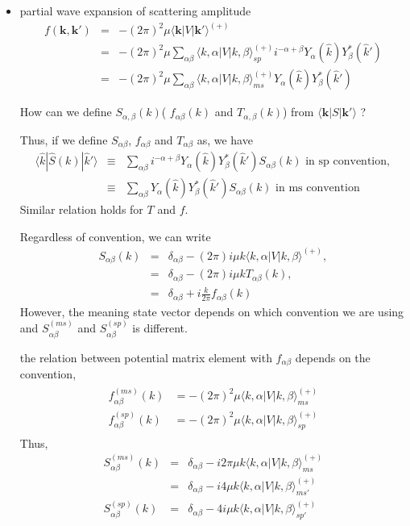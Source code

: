 \documentclass[10pt]{article}
\def\bm{\boldsymbol}
\newcommand{\bea}{\begin{eqnarray}}
\newcommand{\eea}{\end{eqnarray}}
\newcommand{\no}{\nonumber \\}
\def\vk{{\bm k}}
\def\la{\langle}
\def\ra{\rangle}
\begin{document}
\begin{itemize}
\item partial wave expansion of scattering amplitude
\bea
f(\vk,\vk')&=&-(2\pi)^2\mu \la \vk|V|\vk'\ra^{(+)}\no
           &=&-(2\pi)^2\mu \sum_{\alpha\beta} 
        \la k,\alpha|V| k,\beta\ra^{(+)}_{sp}
        i^{-\alpha+\beta}
        Y_{\alpha}(\hat{k})Y_{\beta}^*(\hat{k}') \no
        &=&-(2\pi)^2\mu \sum_{\alpha\beta} 
        \la k,\alpha|V| k,\beta\ra^{(+)}_{ms}
        Y_{\alpha}(\hat{k})Y_{\beta}^*(\hat{k}')  
\eea

How can we define $S_{\alpha,\beta}(k)$( $f_{\alpha\beta}(k)$
and $T_{\alpha,\beta}(k)$) from $\la \vk| S|\vk' \ra$ ?


Thus, if we define $S_{\alpha\beta}$, $f_{\alpha\beta}$ and
$T_{\alpha\beta}$ as, we have
\bea
\la \hat{k}|\hat{S}(k)|\hat{k}'\ra&\equiv&
      \sum_{\alpha\beta} i^{-\alpha+\beta}
      Y_{\alpha}(\hat{k})Y_{\beta}^*(\hat{k}') S_{\alpha\beta}(k)
      \mbox{ in sp convention}
      ,\no
      &\equiv&
      \sum_{\alpha\beta}
      Y_{\alpha}(\hat{k})Y_{\beta}^*(\hat{k}') S_{\alpha\beta}(k)
      \mbox{ in ms convention}
\eea
Similar relation holds for $T$ and $f$.

Regardless of convention,  we can write 
\begin{equation}
\boxed{
\begin{array}{ccl}
S_{\alpha\beta}(k)
&=&\delta_{\alpha\beta}-(2\pi)i \mu k 
        \la k,\alpha| V| k,\beta\ra^{(+)},\\
&=&\delta_{\alpha\beta} -(2\pi)i \mu k T_{\alpha\beta}(k),\\
&=&\delta_{\alpha\beta}+ i\frac{k}{2\pi} f_{\alpha\beta}(k)
\end{array}
}
\end{equation}
However, the meaning state vector depends on which
convention we are using and $S_{\alpha\beta}^{(ms)}$
and $S_{\alpha\beta}^{(sp)}$ is different.

the relation between potential matrix
element with $f_{\alpha\beta}$ depends on the convention,
\bea
\boxed{
\begin{array}{cl}
f_{\alpha\beta}^{(ms)}(k)
&=-(2\pi)^2\mu \la k,\alpha|V|k,\beta\ra^{(+)}_{ms} \\
f_{\alpha\beta}^{(sp)}(k)
&=-(2\pi)^2\mu \la k,\alpha|V|k,\beta\ra^{(+)}_{sp}
\end{array}
}
\eea
Thus,
\bea
S_{\alpha\beta}^{(ms)}(k)
&=&\delta_{\alpha\beta}
  -i2\pi \mu k \la k,\alpha|V|k,\beta\ra^{(+)}_{ms}\no
&=&\delta_{\alpha\beta}
  -i4 \mu k \la k,\alpha|V|k,\beta\ra^{(+)}_{ms'}\no
S_{\alpha\beta}^{(sp)}(k)&=&\delta_{\alpha\beta}
  -4 i \mu k \la k,\alpha|V|k,\beta\ra^{(+)}_{sp'} 
\eea




\end{itemize}
\end{document}
